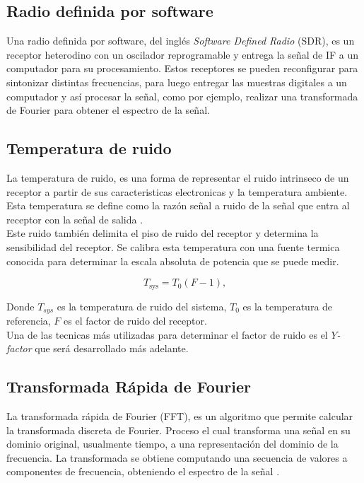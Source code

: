 \subsection{Radio definida por software}

Una radio definida por software, del inglés \textit{Software Defined Radio} (SDR), es un receptor heterodino con un oscilador reprogramable y entrega la señal de IF a un computador para su procesamiento. Estos receptores se pueden reconfigurar para sintonizar distintas frecuencias, para luego entregar las muestras digitales a un computador y así procesar la señal, como por ejemplo, realizar una transformada de Fourier para obtener el espectro de la señal.\\

\subsection{Temperatura de ruido}

La temperatura de ruido, es una forma de representar el ruido intrinseco de un receptor a partir de sus caracteristicas electronicas y la temperatura ambiente. Esta temperatura se define como la razón señal a ruido de la señal que entra al receptor con la señal de salida \cite{teunissen2017springer}.\\

Este ruido también delimita el piso de ruido del receptor y determina la sensibilidad del receptor. Se calibra esta temperatura con una fuente termica conocida para determinar la escala absoluta de potencia que se puede medir.

\begin{equation}
    T_{\text{sys}} = T_{0}(F-1)\text{,}
\end{equation}

Donde $T_{sys}$ es la temperatura de ruido del sistema, $T_{0}$ es la temperatura de referencia, $F$ es el factor de ruido del receptor.\\

Una de las tecnicas más utilizadas para determinar el factor de ruido es el $Y$\textit{-factor} que será desarrollado más adelante.


\subsection{Transformada Rápida de Fourier}

La transformada rápida de Fourier (FFT), es un algoritmo que permite calcular la transformada discreta de Fourier. Proceso el cual transforma una señal en su dominio original, usualmente tiempo, a una representación del dominio de la frecuencia. La transformada se obtiene computando una secuencia de valores a componentes de frecuencia, obteniendo el espectro de la señal \cite{fft}.\\

